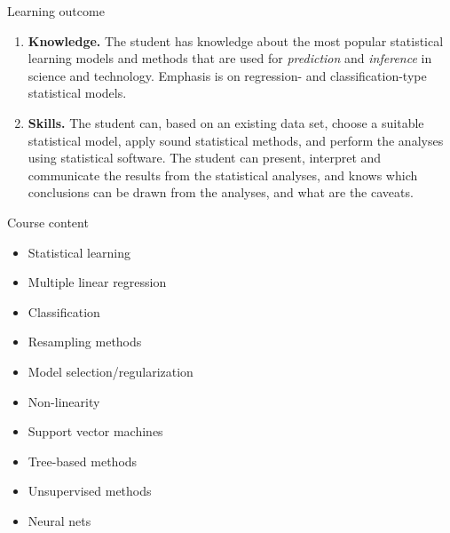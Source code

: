 \documentclass[10pt,ignorenonframetext,]{beamer}
\providecommand{\tightlist}{%
  \setlength{\itemsep}{0pt}\setlength{\parskip}{0pt}}
\begin{document}
\begin{frame}

\begin{block}{Learning outcome}

\begin{enumerate}
\def\labelenumi{\arabic{enumi}.}
\item
  \textbf{Knowledge.} The student has knowledge about the most popular
  statistical learning models and methods that are used for
  \emph{prediction} and \emph{inference} in science and technology.
  Emphasis is on regression- and classification-type statistical models.
\item
  \textbf{Skills.} The student can, based on an existing data set,
  choose a suitable statistical model, apply sound statistical methods,
  and perform the analyses using statistical software. The student can
  present, interpret and communicate the results from the statistical
  analyses, and knows which conclusions can be drawn from the analyses,
  and what are the caveats.
\end{enumerate}

\end{block}

\end{frame}

\begin{frame}

\begin{block}{Course content}

\vspace{2mm}

\begin{itemize}
\tightlist
\item
  Statistical learning
\item
  Multiple linear regression
\item
  Classification
\item
  Resampling methods
\item
  Model selection/regularization
\item
  Non-linearity
\item
  Support vector machines
\item
  Tree-based methods
\item
  Unsupervised methods
\item
  Neural nets
\end{itemize}

\end{block}

\end{frame}
\end{document}
